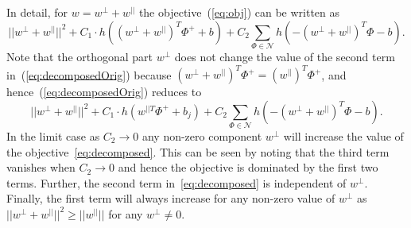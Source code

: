 \documentclass[table]{article} %
\begin{document}
In detail, for $w=w^{\perp}+w^{||}$ the objective~(\ref{eq:obj}) can be written as
	  	\begin{equation}
	        ||w^{\perp}+w^{||}||^{2} +
	        C_1 \cdot h
	        \left(
	        	(w^{\perp}+w^{||})^T\Phi^+ + b
	        \right)+
	        C_2\sum_{\Phi\in \mathcal N} h
	        \left(
	        	-(w^{\perp}+w^{||})^T\Phi-b
	        \right).
            \label{eq:decomposedOrig}
	   \end{equation}
	  	Note that the orthogonal part $w^{\perp}$ does not change the value of  the second term in~(\ref{eq:decomposedOrig}) because $(w^{\perp}+w^{||})^T\Phi^+=(w^{||})^T\Phi^+$, and hence~(\ref{eq:decomposedOrig}) reduces to
        \begin{equation} 
            ||w^{\perp}+w^{||}||^{2} +
            C_1 \cdot h
            \left(
                w^{||T}\Phi^+ +b_j
            \right)+
            C_2\sum_{\Phi\in \mathcal N} h
            \left(
                -(w^{\perp}+w^{||})^T\Phi-b
            \right).
            \label{eq:decomposed} 
        \end{equation}  
        	In the limit case as $C_2 \rightarrow 0$ any non-zero component $w^{\perp}$
	will increase the value of the objective~\eqref{eq:decomposed}. 
	This can be seen by noting that the third term vanishes when $C_2 \rightarrow 0$ and hence the objective is dominated by the first two terms. Further,  	
	the second term in~\eqref{eq:decomposed} is independent of $w^{\perp}$. Finally, the first term will always increase for any non-zero value of $w^{\perp}$ as 
        $||w^{\perp}+w^{||}||^{2} \geq ||w^{||}||$ for any $w^{\perp}\neq0$.
		             
\end{document}
